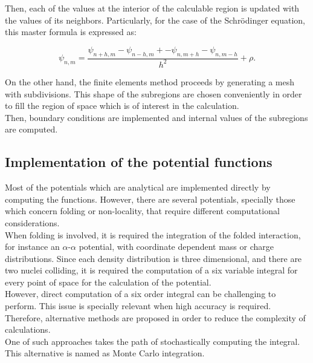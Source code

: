 \documentclass[openany]{book}
\begin{document}
Then, each of the values at the interior of the calculable region is updated with the values of its neighbors. Particularly, for the case of the Schrödinger equation, this master formula is expressed as:

\begin{equation}\label{eq:numericalIntegration_elements_formula}
	\psi_{n,m} = \frac{\psi_{n + h, m}  -  \psi_{n - h, m}  +  -  \psi_{n, m + h} - \psi_{n, m - h} }{h^2} + \rho.
\end{equation}

On the other hand, the finite elements method proceeds by generating a mesh with subdivisions. This shape of the subregions are chosen conveniently in order to fill the region of space which is of interest in the calculation. \\

Then, boundary conditions are implemented and internal values of the subregions are computed. \\


\subsection{Implementation of the potential functions} \label{sub:diffSolvingPotential}

Most of the potentials which are analytical are implemented directly by computing the functions. However, there are several potentials, specially those which concern folding or non-locality, that require different computational considerations. \\

When folding is involved, it is required the integration of the folded interaction, for instance an $\alpha$-$\alpha$ potential, with coordinate dependent mass or charge distributions. Since each density distribution is three dimensional, and there are two nuclei colliding, it is required the computation of a six variable integral for every point of space for the calculation of the potential. \\

However, direct computation of a six order integral can be challenging to perform. This issue is specially relevant when high accuracy is required. Therefore, alternative methods are proposed in order to reduce the complexity of calculations. \\

One of such approaches takes the path of stochastically computing the integral. This alternative is named as Monte Carlo integration. \\
\end{document}
